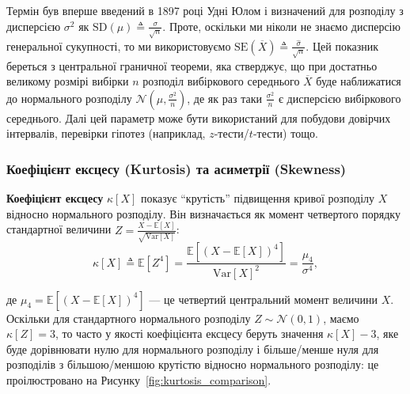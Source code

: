 \documentclass{exam_template}
\begin{document}
Термін був вперше введений в 1897 році Удні Юлом і визначений для розподілу з
дисперсією $\sigma^2$ як $\text{SD}(\mu) \triangleq \frac{\sigma}{\sqrt{n}}$.
Проте, оскільки ми ніколи не знаємо дисперсію генеральної сукупності, то ми
використовуємо $\text{SE}(\overline{X}) \triangleq
\frac{\widehat{\sigma}}{\sqrt{n}}$. Цей показник береться з центральної
граничної теореми, яка стверджує, що при достатньо великому розмірі вибірки $n$
розподіл вибіркового середнього $\overline{X}$ буде наближатися до нормального
розподілу $\mathcal{N}\left(\mu,\frac{\sigma^2}{n}\right)$, де як раз таки
$\frac{\sigma^2}{n}$ є дисперсією вибіркового середнього. Далі цей параметр може
бути використаний для побудови довірчих інтервалів, перевірки гіпотез
(наприклад, $z$-тести/$t$-тести) тощо.

\subsubsection{Коефіцієнт ексцесу (Kurtosis) та асиметрії (Skewness)}\label{sec:kurtosis_skewness}

\textbf{Коефіцієнт ексцесу} $\kappa[X]$ показує ``крутість'' підвищення кривої
розподілу $X$ відносно нормального розподілу. Він визначається як момент
четвертого порядку стандартної величини $Z =
\frac{X-\mathbb{E}[X]}{\sqrt{\text{Var}[X]}}$:
\begin{equation*}
    \kappa[X] \triangleq \mathbb{E}[Z^4] = \frac{\mathbb{E}[(X - \mathbb{E}[X])^4]}{\text{Var}[X]^2} = \frac{\mu_4}{\sigma^4},
\end{equation*}

де $\mu_4 = \mathbb{E}[(X - \mathbb{E}[X])^4]$ — це четвертий центральний момент
величини $X$. Оскільки для стандартного нормального розподілу $Z \sim
\mathcal{N}(0,1)$, маємо $\kappa[Z] = 3$, то часто у якості коефіцієнта ексцесу
беруть значення $\kappa[X] - 3$, яке буде дорівнювати нулю для нормального
розподілу і більше/менше нуля для розподілів з більшою/меншою крутістю відносно
нормального розподілу: це проілюстровано на
Рисунку~\ref{fig:kurtosis_comparison}.
\end{document}

